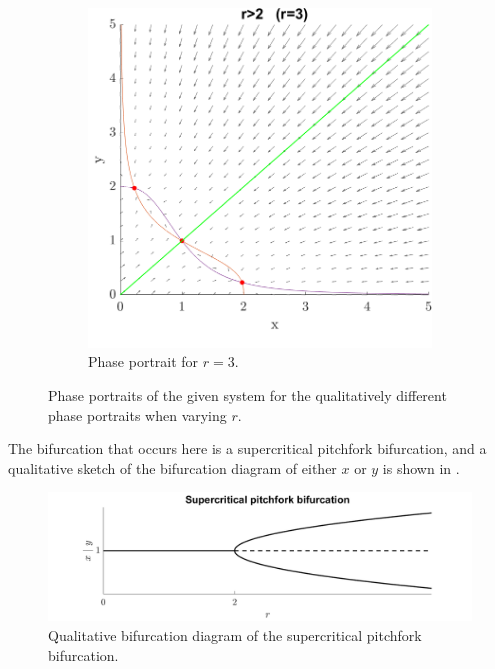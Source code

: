 \documentclass[a4paper,11pt]{article}
\begin{document}
\begin{figure}[H]
{		\begin{subfigure}[b]{0.5\textwidth}
		\includegraphics[width=\textwidth]{rgt2.png}
		\caption{Phase portrait for $r=3$.}
		\label{fig:rgt2}
		\end{subfigure}
	}
	\label{fig:pp1}
	\vspace{-3mm}
	\caption{Phase portraits of the given system for the qualitatively different phase portraits when varying $r$.}
\end{figure}
The bifurcation that occurs here is a supercritical pitchfork bifurcation, and a qualitative sketch of the bifurcation diagram of
either $x$ or $y$ is shown in .
\begin{figure}[H]
	\centering
	\includegraphics[width=1.1\textwidth]{suppit.png}
	\caption{Qualitative bifurcation diagram of the supercritical pitchfork bifurcation.}
	\label{fig:bif} 
\end{figure}
\end{document}
